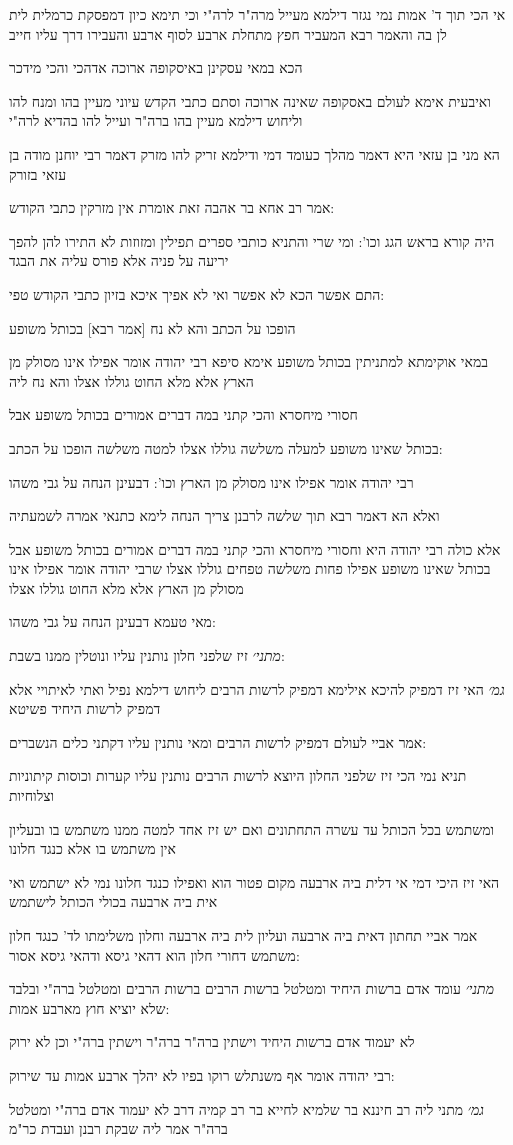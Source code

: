 \documentclass[12pt, openany]{book}
\newcommand{\sethebfont}{
\fontsize{10.5pt}{21.0pt} \selectfont
}
\newcommand{\textblock}[1]{
{\sethebfont #1\\}	
}
\begin{document}
\textblock{אי הכי תוך ד' אמות נמי נגזר דילמא מעייל מרה"ר לרה"י וכי תימא כיון דמפסקת כרמלית לית לן בה והאמר רבא המעביר חפץ מתחלת ארבע לסוף ארבע והעבירו דרך עליו חייב}
\textblock{הכא במאי עסקינן באיסקופה ארוכה אדהכי והכי מידכר}
\textblock{ואיבעית אימא לעולם באסקופה שאינה ארוכה וסתם כתבי הקדש עיוני מעיין בהו ומנח להו וליחוש דילמא מעיין בהו ברה"ר ועייל להו בהדיא לרה"י}
\textblock{הא מני בן עזאי היא דאמר מהלך כעומד דמי ודילמא זריק להו מזרק דאמר רבי יוחנן מודה בן עזאי בזורק}
\textblock{אמר רב אחא בר אהבה זאת אומרת אין מזרקין כתבי הקודש:}
\textblock{היה קורא בראש הגג וכו': ומי שרי והתניא כותבי ספרים תפילין ומזוזות לא התירו להן להפך יריעה על פניה אלא פורס עליה את הבגד}
\textblock{התם אפשר הכא לא אפשר ואי לא אפיך איכא בזיון כתבי הקודש טפי:}
\textblock{הופכו על הכתב והא לא נח [אמר רבא] בכותל משופע}
\textblock{[אמר ליה אביי] במאי אוקימתא למתניתין בכותל משופע אימא סיפא רבי יהודה אומר אפילו אינו מסולק מן הארץ אלא מלא החוט גוללו אצלו והא נח ליה}
\textblock{חסורי מיחסרא והכי קתני במה דברים אמורים בכותל משופע אבל}
\textblock{בכותל שאינו משופע למעלה משלשה גוללו אצלו למטה משלשה הופכו על הכתב:}
\textblock{רבי יהודה אומר אפילו אינו מסולק מן הארץ וכו': דבעינן הנחה על גבי משהו}
\textblock{ואלא הא דאמר רבא תוך שלשה לרבנן צריך הנחה לימא כתנאי אמרה לשמעתיה}
\textblock{אלא כולה רבי יהודה היא וחסורי מיחסרא והכי קתני במה דברים אמורים בכותל משופע אבל בכותל שאינו משופע אפילו פחות משלשה טפחים גוללו אצלו שרבי יהודה אומר אפילו אינו מסולק מן הארץ אלא מלא החוט גוללו אצלו}
\textblock{מאי טעמא דבעינן הנחה על גבי משהו:}
\textblock{{\large\emph{מתני׳}} זיז שלפני חלון נותנין עליו ונוטלין ממנו בשבת:}
\textblock{{\large\emph{גמ׳}} האי זיז דמפיק להיכא אילימא דמפיק לרשות הרבים ליחוש דילמא נפיל ואתי לאיתויי אלא דמפיק לרשות היחיד פשיטא}
\textblock{אמר אביי לעולם דמפיק לרשות הרבים ומאי נותנין עליו דקתני כלים הנשברים:}
\textblock{תניא נמי הכי זיז שלפני החלון היוצא לרשות הרבים נותנין עליו קערות וכוסות קיתוניות וצלוחיות}
\textblock{ומשתמש בכל הכותל עד עשרה התחתונים ואם יש זיז אחד למטה ממנו משתמש בו ובעליון אין משתמש בו אלא כנגד חלונו}
\textblock{האי זיז היכי דמי אי דלית ביה ארבעה מקום פטור הוא ואפילו כנגד חלונו נמי לא ישתמש ואי אית ביה ארבעה בכולי הכותל לישתמש}
\textblock{אמר אביי תחתון דאית ביה ארבעה ועליון לית ביה ארבעה וחלון משלימתו לד' כנגד חלון משתמש דחורי חלון הוא דהאי גיסא ודהאי גיסא אסור:}
\textblock{{\large\emph{מתני׳}} עומד אדם ברשות היחיד ומטלטל ברשות הרבים ברשות הרבים ומטלטל ברה"י ובלבד שלא יוציא חוץ מארבע אמות:}
\textblock{לא יעמוד אדם ברשות היחיד וישתין ברה"ר ברה"ר וישתין ברה"י וכן לא ירוק}
\textblock{רבי יהודה אומר אף משנתלש רוקו בפיו לא יהלך ארבע אמות עד שירוק:}
\textblock{{\large\emph{גמ׳}} מתני ליה רב חיננא בר שלמיא לחייא בר רב קמיה דרב לא יעמוד אדם ברה"י ומטלטל ברה"ר אמר ליה שבקת רבנן ועבדת כר"מ}
\end{document}
